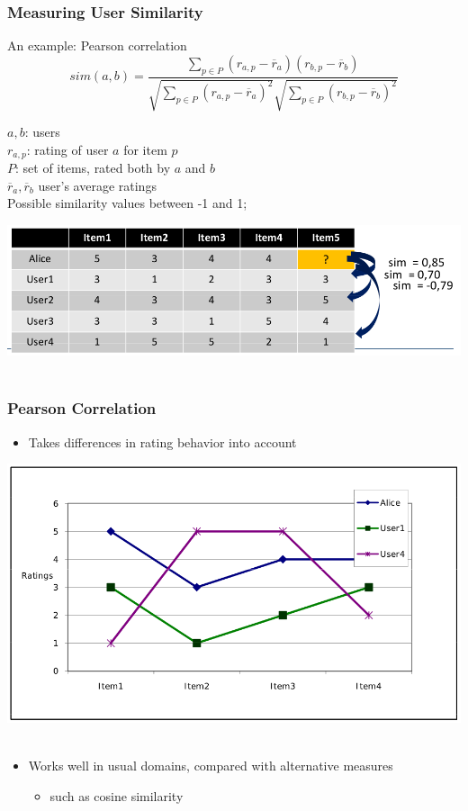 \documentclass{beamer}
\begin{document}
\begin{frame}
    \frametitle{Measuring User Similarity}
    \begin{block}{An example: Pearson correlation}
        \begin{displaymath}
            sim(a,b) = \frac{\sum_{p \in P}(r_{a,p}-\overline{r}_a)(r_{b,p}-\overline{r}_b)}{\sqrt{\sum_{p \in P}(r_{a,p}-\overline{r}_a)^2}\sqrt{\sum_{p \in P}(r_{b,p}-\overline{r}_b)^2}}
        \end{displaymath}
        \centering
        \begin{minipage}{0.7\linewidth}
            \footnotesize
            $a,b$: users\\
            $r_{a,p}$: rating of user $a$ for item $p$\\
            $P$: set of items, rated both by $a$ and $b$\\
            $\overline{r}_a,\overline{r}_b$ user's average ratings\\
            Possible similarity values between -1 and 1;
        \end{minipage}
    \end{block}
    \hfill\includegraphics[width=\linewidth]{pearson}\hfill~
\end{frame}

\begin{frame}
    \frametitle{Pearson Correlation}
    \begin{itemize}
    \item Takes differences in rating behavior into account
    \end{itemize}
    \hfill\includegraphics[width=.8\linewidth]{pearson2}\hfill~
    \begin{itemize}
    \item Works well in usual domains, compared with alternative measures
        \begin{itemize}
        \item such as cosine similarity
        \end{itemize}
    \end{itemize}
\end{frame}
\end{document}
